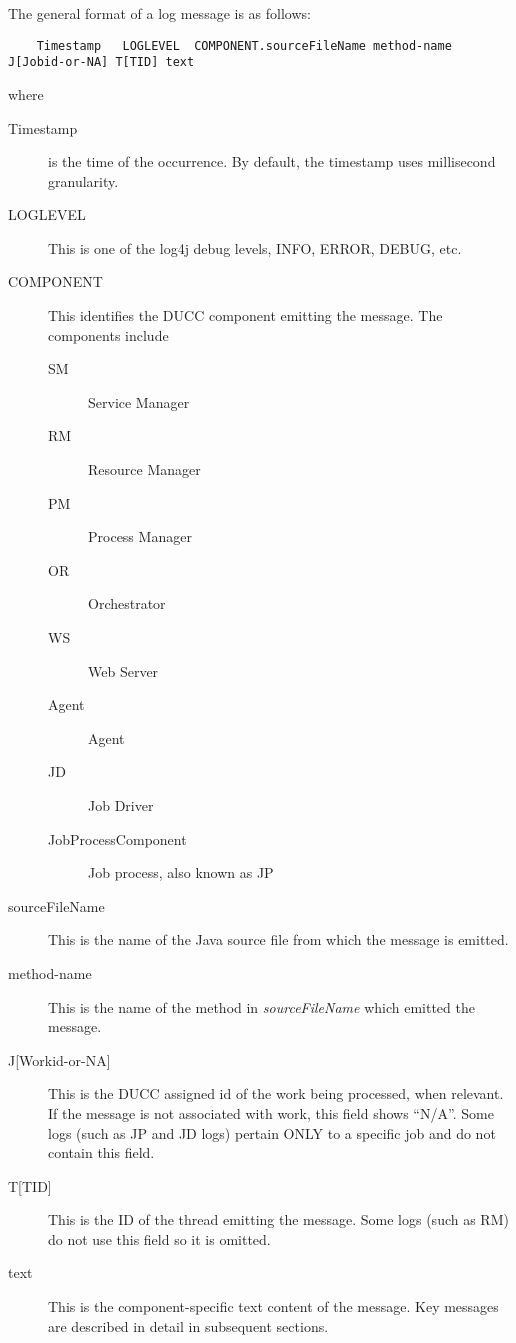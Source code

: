     The general format of a log message is as follows:
\begin{verbatim}
    Timestamp   LOGLEVEL  COMPONENT.sourceFileName method-name J[Jobid-or-NA] T[TID] text
\end{verbatim}
    where
    \begin{description}
      \item[Timestamp] is the time of the occurrence.  By default, the timestamp uses millisecond granularity.
      \item[LOGLEVEL] This is one of the log4j debug levels, INFO, ERROR, DEBUG, etc.
      \item[COMPONENT] This identifies the DUCC component emitting the message.  The components include
        \begin{description}
          \item[SM] Service Manager
          \item[RM] Resource Manager
          \item[PM] Process Manager
          \item[OR] Orchestrator
          \item[WS] Web Server
          \item[Agent] Agent            
          \item[JD] Job Driver
          \item[JobProcessComponent] Job process, also known as JP
        \end{description}
      \item[sourceFileName] This is the name of the Java source file from which the message is emitted.
      \item[method-name] This is the name of the method in {\em sourceFileName} which emitted the message.
      \item[{J[Workid-or-NA]}] This is the DUCC assigned id of the work being processed, when relevant.  If the
        message is not associated with work, this field shows ``N/A''.  Some logs (such as JP and JD logs)
        pertain ONLY to a specific job and do not contain this field.
      \item[{T[TID]}] This is the ID of the thread emitting the message.  Some logs (such as RM) do not use
        this field so it is omitted.
      \item[text] This is the component-specific text content of the message.  Key messages are described
        in detail in subsequent sections.

    \end{description}

